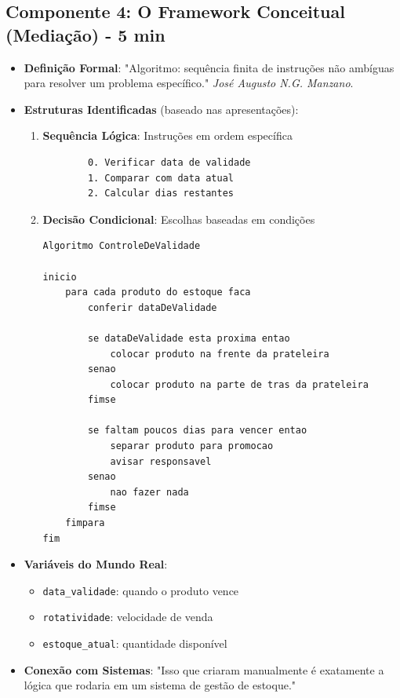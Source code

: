 \documentclass{lesson_plan}
\begin{document}
\subsection{Componente 4: O Framework Conceitual (Mediação) - 5 min}
\begin{itemize}
    \item \textbf{Definição Formal}: "Algoritmo: sequência finita de instruções não ambíguas para resolver um problema específico." \textit{José Augusto N.G. Manzano}.
    \item \textbf{Estruturas Identificadas} (baseado nas apresentações):
    \begin{enumerate}
        \item \textbf{Sequência Lógica}: Instruções em ordem específica
        \begin{verbatim}
        0. Verificar data de validade
        1. Comparar com data atual
        2. Calcular dias restantes
        \end{verbatim}
        \item \textbf{Decisão Condicional}: Escolhas baseadas em condições
        \begin{verbatim}
Algoritmo ControleDeValidade

inicio
    para cada produto do estoque faca
        conferir dataDeValidade

        se dataDeValidade esta proxima entao
            colocar produto na frente da prateleira
        senao
            colocar produto na parte de tras da prateleira
        fimse

        se faltam poucos dias para vencer entao
            separar produto para promocao
            avisar responsavel
        senao
            nao fazer nada
        fimse
    fimpara
fim
\end{verbatim}

    \end{enumerate}
    \newpage
    \item \textbf{Variáveis do Mundo Real}: 
    \begin{itemize}
        \item \texttt{data\_validade}: quando o produto vence
        \item \texttt{rotatividade}: velocidade de venda
        \item \texttt{estoque\_atual}: quantidade disponível
    \end{itemize}
    \item \textbf{Conexão com Sistemas}: "Isso que criaram manualmente é exatamente a lógica que rodaria em um sistema de gestão de estoque."
\end{itemize}
\end{document}
